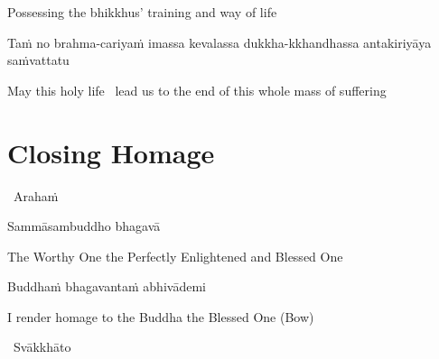 \begin{english}
    Possessing the bhikkhus' training and way of life\makeatletter\hyperlink{endnote28-appendix}\makeatother
\end{english}

\begin{pali-hang}
  Taṁ no brahma-cariyaṁ imassa kevalassa dukkha-kkhandhassa antakiriyāya saṁvattatu
\end{pali-hang}

\begin{english}
  May this holy life \breathmark\ lead us to the end of this whole mass of suffering
\end{english}


\section{Closing Homage}
\label{closing-homage}

\vspace{5pt}

\begin{leader}
  \anglebracketleft\ \hspace{-0.5mm}Arahaṁ \hspace{-0.5mm}\anglebracketright\
\end{leader}

\vspace{-0.5cm}

Sammāsambuddho bhagavā

\begin{english}
  The Worthy One the Perfectly Enlightened and Blessed One
\end{english}

Buddhaṁ bhagavantaṁ abhivādemi

\begin{english}
  I render homage to the Buddha the Blessed One \hfill{(Bow)}
\end{english}

\begin{leader}
  \anglebracketleft\ \hspace{-0.5mm}Svākkhāto \hspace{-0.5mm}\anglebracketright\
\end{leader}

